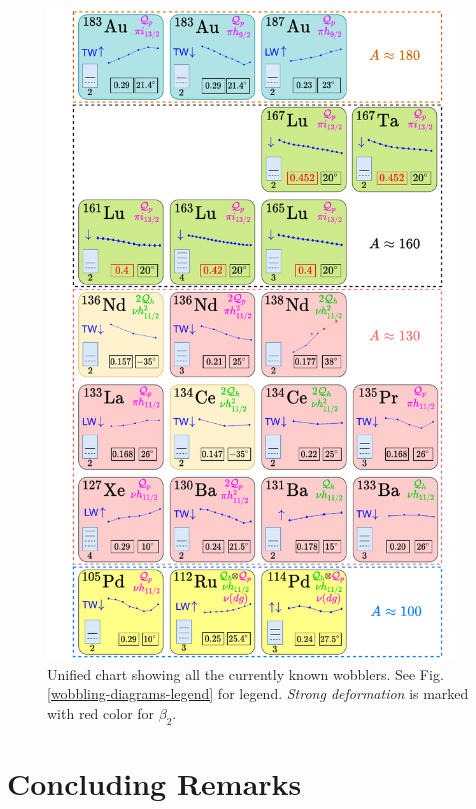 \begin{figure}
    \centering
    \includegraphics[width=0.96\textwidth]{Chapters/Figures/wobblers-chart.pdf}
    \caption{Unified chart showing all the currently known wobblers. See Fig. \ref{wobbling-diagrams-legend} for legend. \emph{Strong deformation} is marked with red color for $\beta_2$.}
    \label{wobbling-diagram-chart}
\end{figure}

\section{Concluding Remarks}
\label{chapter-3-concluding-remarks}

